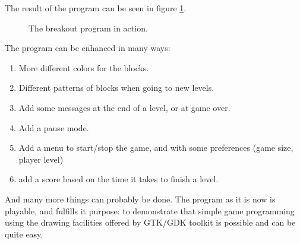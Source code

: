 \documentclass[10pt]{article}
\begin{document}
The result of the program can be seen in figure \ref{fig:breakout}.
\begin{figure}[ht]
\caption{The breakout program in action.}\label{fig:breakout}
\end{figure}
The program can be enhanced in many ways:
\begin{enumerate}
\item More different colors for the blocks.
\item Different patterns of blocks when going to new levels.
\item Add some messages at the end of a level, or at game over.
\item Add a pause mode.
\item Add a menu to start/stop the game, and with some preferences
(game size, player level)
\item add a score based on the time it takes to finish a level.
\end{enumerate}
And many more things can probably be done. The program as it is now is playable, and 
fulfills it purpose: to demonstrate that simple game programming using the drawing 
facilities offered by GTK/GDK toolkit is possible and can be quite easy.
\end{document}
